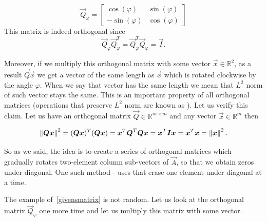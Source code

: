 \begin{equation} \label{givensmatrix}
\vec{Q}_\varphi = 
\begin{bmatrix} 
\cos(\varphi) & \sin(\varphi) \\
- \sin(\varphi) & \cos(\varphi)
\end{bmatrix}
\end{equation}
This matrix is indeed orthogonal since 
\begin{equation} 
\vec{Q}_\varphi\vec{Q}_\varphi^T = \vec{Q}_\varphi^T\vec{Q}_\varphi = \vec{I}.
\end{equation}
 

Moreover, if we multiply this orthogonal matrix with some vector $\vec{x} \in \mathbb{R}^{2}$, as a result $\vec{Q}\vec{x}$ we get a vector of the same length as $\vec{x}$ which is rotated clockwise by the angle $\varphi$. When we say that vector has the same length we mean that $L^2$ norm of such vector stays the same. This is an important property of all orthogonal matrices (operations that preserve $L^2$ norm are known as ). Let us verify this claim. Let us have an orthogonal matrix $\vec{Q} \in \mathbb{R}^{m \times m}$ and any vector $\vec{x} \in  \mathbb{R}^{m}$ then

\begin{equation}
    \left\lVert\boldsymbol{Q}\boldsymbol{x}\right\rVert^2 = (\boldsymbol{Q}\boldsymbol{x})^T (\boldsymbol{Q}\boldsymbol{x}) = \boldsymbol{x}^T\boldsymbol{Q}^T\boldsymbol{Q}\boldsymbol{x} = 
    \boldsymbol{x}^T\boldsymbol{I}\boldsymbol{x} = \boldsymbol{x}^T\boldsymbol{x} = \left\lVert\boldsymbol{x}\right\rVert^2.
\end{equation}

So as we said,  the idea is to create a series of orthogonal matrices which gradually rotates two-element column sub-vectors of $\vec{A}$, so that we obtain zeros under diagonal. One such method -  uses  that erase one element under diagonal at a time.

The example of~\eqref{givensmatrix} is not random. Let us look at the orthogonal matrix  $\vec{Q}_\varphi$ one more time and let us multiply this matrix with some vector.

